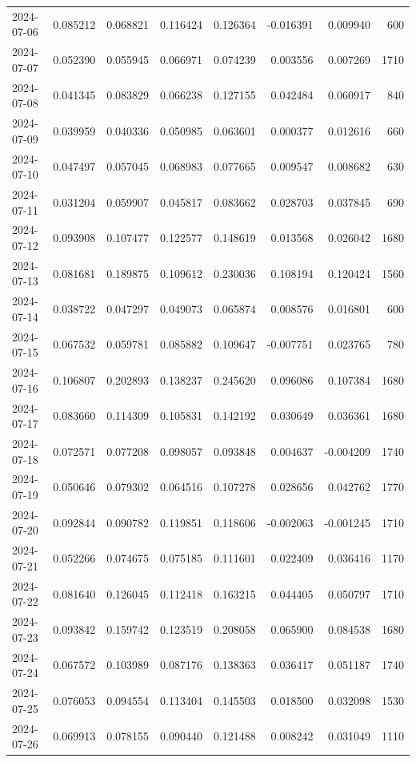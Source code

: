\begin{tabular}{lrrrrrrr}
2024-07-06 & 0.085212 & 0.068821 & 0.116424 & 0.126364 & -0.016391 & 0.009940 & 600 \\
2024-07-07 & 0.052390 & 0.055945 & 0.066971 & 0.074239 & 0.003556 & 0.007269 & 1710 \\
2024-07-08 & 0.041345 & 0.083829 & 0.066238 & 0.127155 & 0.042484 & 0.060917 & 840 \\
2024-07-09 & 0.039959 & 0.040336 & 0.050985 & 0.063601 & 0.000377 & 0.012616 & 660 \\
2024-07-10 & 0.047497 & 0.057045 & 0.068983 & 0.077665 & 0.009547 & 0.008682 & 630 \\
2024-07-11 & 0.031204 & 0.059907 & 0.045817 & 0.083662 & 0.028703 & 0.037845 & 690 \\
2024-07-12 & 0.093908 & 0.107477 & 0.122577 & 0.148619 & 0.013568 & 0.026042 & 1680 \\
2024-07-13 & 0.081681 & 0.189875 & 0.109612 & 0.230036 & 0.108194 & 0.120424 & 1560 \\
2024-07-14 & 0.038722 & 0.047297 & 0.049073 & 0.065874 & 0.008576 & 0.016801 & 600 \\
2024-07-15 & 0.067532 & 0.059781 & 0.085882 & 0.109647 & -0.007751 & 0.023765 & 780 \\
2024-07-16 & 0.106807 & 0.202893 & 0.138237 & 0.245620 & 0.096086 & 0.107384 & 1680 \\
2024-07-17 & 0.083660 & 0.114309 & 0.105831 & 0.142192 & 0.030649 & 0.036361 & 1680 \\
2024-07-18 & 0.072571 & 0.077208 & 0.098057 & 0.093848 & 0.004637 & -0.004209 & 1740 \\
2024-07-19 & 0.050646 & 0.079302 & 0.064516 & 0.107278 & 0.028656 & 0.042762 & 1770 \\
2024-07-20 & 0.092844 & 0.090782 & 0.119851 & 0.118606 & -0.002063 & -0.001245 & 1710 \\
2024-07-21 & 0.052266 & 0.074675 & 0.075185 & 0.111601 & 0.022409 & 0.036416 & 1170 \\
2024-07-22 & 0.081640 & 0.126045 & 0.112418 & 0.163215 & 0.044405 & 0.050797 & 1710 \\
2024-07-23 & 0.093842 & 0.159742 & 0.123519 & 0.208058 & 0.065900 & 0.084538 & 1680 \\
2024-07-24 & 0.067572 & 0.103989 & 0.087176 & 0.138363 & 0.036417 & 0.051187 & 1740 \\
2024-07-25 & 0.076053 & 0.094554 & 0.113404 & 0.145503 & 0.018500 & 0.032098 & 1530 \\
2024-07-26 & 0.069913 & 0.078155 & 0.090440 & 0.121488 & 0.008242 & 0.031049 & 1110 \\

\end{tabular}
